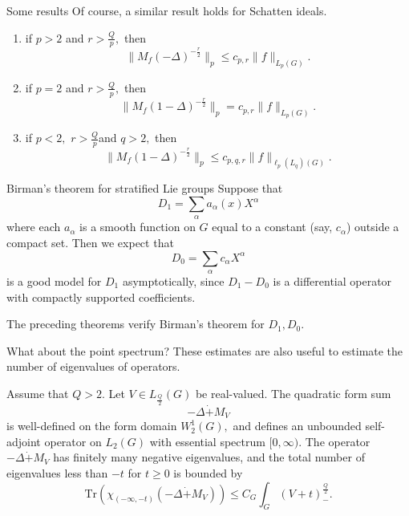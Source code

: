 \documentclass{beamer}
\numberwithin{equation}{section}
\theoremstyle{plain}
\theoremstyle{plain}
\theoremstyle{definition}
\theoremstyle{plain}
\theoremstyle{plain}
\theoremstyle{definition}
\newcommand{\Tr}{\mathrm{Tr}}
\begin{document}
\begin{frame}{Some results}
Of course, a similar result holds for Schatten ideals.

\begin{theorem}\label{cwikel schatten_theorem}
\begin{enumerate}[{\rm (i)}]
\item if $p>2$ and $r>\frac{Q}{p},$ then
$$\|M_f(-\Delta)^{-\frac{r}{2}}\|_p\leq c_{p,r}\|f\|_{L_p(G)}.$$
\item if $p=2$ and $r>\frac{Q}{p},$ then
$$\|M_f(1-\Delta)^{-\frac{r}{2}}\|_p=c_{p,r}\|f\|_{L_p(G)}.$$
\item if $p<2,$ $r>\frac{Q}{p}$and $q>2,$ then
$$\|M_f(1-\Delta)^{-\frac{r}{2}}\|_p\leq c_{p,q,r}\|f\|_{\ell_p(L_q)(G)}.$$
\end{enumerate}
\end{theorem}
\end{frame}


\begin{frame}{Birman's theorem for stratified Lie groups}
  Suppose that
  \[
      D_1 = \sum_{\alpha} a_{\alpha}(x)X^{\alpha}
  \]
  where each $a_{\alpha}$ is a smooth function on $G$ equal to a constant (say, $c_{\alpha}$) outside a compact set.
  Then we expect that
  \[
      D_0 = \sum_{\alpha} c_{\alpha}X^{\alpha}
  \]
  is a good model for $D_1$ asymptotically, since $D_1-D_0$ is a differential operator with compactly supported coefficients.

  The preceding theorems verify Birman's theorem for $D_1,D_0.$
\end{frame}

\begin{frame}{What about the point spectrum?}
  These estimates are also useful to estimate the number of eigenvalues of operators.
\begin{theorem}\label{CLR_theorem}
    Assume that $Q>2.$ Let $V \in L_{\frac{Q}{2}}(G)$ be real-valued. The quadratic form sum
    \[
        -\Delta\dot{+}M_V
    \]
    is well-defined on the form domain $W^1_2(G),$ and defines an unbounded self-adjoint operator on $L_2(G)$ with essential spectrum $[0,\infty).$ The operator $-\Delta\dot{+}M_V$ has finitely many negative eigenvalues, and the total number of eigenvalues less than $-t$ for $t\geq 0$ is bounded by
    \[
        \Tr(\chi_{(-\infty,-t)}(-\Delta\dot{+}M_V)) \leq C_{G}\int_{G} (V+t)_-^{\frac{Q}{2}}.
    \]
\end{theorem}
\end{frame}
\end{document}
